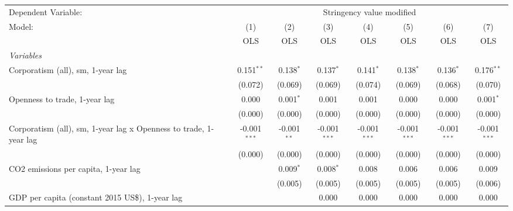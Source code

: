 
\begingroup
\centering
\begin{tabular}{lccccccc}
   \toprule
   Dependent Variable: & \multicolumn{7}{c}{Stringency value modified}\\
   Model:                                                            & (1)            & (2)           & (3)            & (4)            & (5)            & (6)            & (7)\\  
                                                                     &  OLS           & OLS           & OLS            & OLS            & OLS            & OLS            & OLS\\  
   \midrule
   \emph{Variables}\\
   Corporatism (all), sm, 1-year lag                                 & 0.151$^{**}$   & 0.138$^{*}$   & 0.137$^{*}$    & 0.141$^{*}$    & 0.138$^{*}$    & 0.136$^{*}$    & 0.176$^{**}$\\   
                                                                     & (0.072)        & (0.069)       & (0.069)        & (0.074)        & (0.069)        & (0.068)        & (0.070)\\   
   Openness to trade, 1-year lag                                     & 0.000          & 0.001$^{*}$   & 0.001          & 0.001          & 0.000          & 0.000          & 0.001$^{*}$\\   
                                                                     & (0.000)        & (0.000)       & (0.000)        & (0.000)        & (0.000)        & (0.000)        & (0.000)\\   
   Corporatism (all), sm, 1-year lag x Openness to trade, 1-year lag & -0.001$^{***}$ & -0.001$^{**}$ & -0.001$^{***}$ & -0.001$^{***}$ & -0.001$^{***}$ & -0.001$^{***}$ & -0.001$^{***}$\\   
                                                                     & (0.000)        & (0.000)       & (0.000)        & (0.000)        & (0.000)        & (0.000)        & (0.000)\\   
   CO2 emissions per capita, 1-year lag                              &                & 0.009$^{*}$   & 0.008$^{*}$    & 0.008          & 0.006          & 0.006          & 0.009\\   
                                                                     &                & (0.005)       & (0.005)        & (0.005)        & (0.005)        & (0.005)        & (0.006)\\   
   GDP per capita (constant 2015 US\$), 1-year lag                   &                &               & 0.000          & 0.000          & 0.000          & 0.000          & 0.000\\   

\end{tabular}
